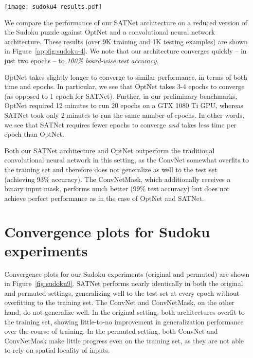 \documentclass{article}
\begin{document}
{{\begin{figure*}[t!]
		\texttt{[image: sudoku4\_results.pdf]}
		
		\caption{Results for  Sudoku. Lower loss (mean NLL loss and mean MSE loss) and higher whole-board accuracy (\% puzzles correct) are better.}
		\label{appfig:sudoku-4}
	\end{figure*}
	
	We compare the performance of our SATNet architecture on a  reduced version of the Sudoku puzzle against OptNet \cite{amos2017optnet} and a convolutional neural network architecture.
	These results (over 9K training and 1K testing examples) are shown in Figure~\ref{appfig:sudoku-4}.
	We note that our architecture converges quickly -- in just two epochs -- to \emph{100\% board-wise test accuracy}. 
	
	OptNet takes slightly longer to converge to similar performance, in terms of both time and epochs.
	In particular, we see that OptNet takes 3-4 epochs to converge (as opposed to 1 epoch for SATNet).
	Further, in our preliminary benchmarks,  OptNet required 12 minutes to run 20 epochs on a GTX 1080 Ti GPU, whereas SATNet took only 2 minutes to run the same number of epochs.
	In other words, we see that SATNet requires fewer epochs to converge \emph{and} takes less time per epoch than OptNet.
	
	Both our SATNet architecture and OptNet outperform the traditional convolutional neural network in this setting, as the ConvNet somewhat overfits to the training set and therefore does not generalize as well to the test set (achieving 93\% accuracy). 
	The ConvNetMask, which additionally receives a binary input mask, performs much better (99\% test accuracy) but does not achieve perfect performance as in the case of OptNet and SATNet.

    \section{Convergence plots for  Sudoku experiments}
	\label{appsec:sudoku-9}
    
    Convergence plots for our  Sudoku experiments (original and permuted) are shown in Figure~\ref{fig:sudoku9}. 
    SATNet performs nearly identically in both the original and permuted settings, generalizing well to the test set at every epoch without overfitting to the training set.
    The ConvNet and ConvNetMask, on the other hand, do not generalize well.
    In the original setting, both architectures overfit to the training set, showing little-to-no improvement in generalization performance over the course of training.
    In the permuted setting, both ConvNet and ConvNetMask make little progress even on the training set, as they are not able to rely on spatial locality of inputs.
    
}}
\end{document}

